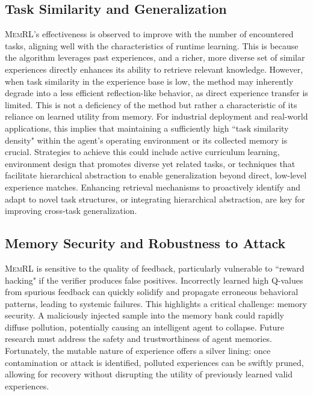 \documentclass{article}
\theoremstyle{plain}
\theoremstyle{definition}
\theoremstyle{remark}
\begin{document}
\subsection{Task Similarity and Generalization}
\textsc{MemRL}'s effectiveness is observed to improve with the number of encountered tasks, aligning well with the characteristics of runtime learning. This is because the algorithm leverages past experiences, and a richer, more diverse set of similar experiences directly enhances its ability to retrieve relevant knowledge. However, when task similarity in the experience base is low, the method may inherently degrade into a less efficient reflection-like behavior, as direct experience transfer is limited. This is not a deficiency of the method but rather a characteristic of its reliance on learned utility from memory. For industrial deployment and real-world applications, this implies that maintaining a sufficiently high ``task similarity density" within the agent's operating environment or its collected memory is crucial. Strategies to achieve this could include active curriculum learning, environment design that promotes diverse yet related tasks, or techniques that facilitate hierarchical abstraction to enable generalization beyond direct, low-level experience matches. Enhancing retrieval mechanisms to proactively identify and adapt to novel task structures, or integrating hierarchical abstraction, are key for improving cross-task generalization.

\subsection{Memory Security and Robustness to Attack}
\textsc{MemRL} is sensitive to the quality of feedback, particularly vulnerable to ``reward hacking" if the verifier produces false positives. Incorrectly learned high Q-values from spurious feedback can quickly solidify and propagate erroneous behavioral patterns, leading to systemic failures. This highlights a critical challenge: memory security. A maliciously injected sample into the memory bank could rapidly diffuse pollution, potentially causing an intelligent agent to collapse. Future research must address the safety and trustworthiness of agent memories. Fortunately, the mutable nature of experience offers a silver lining: once contamination or attack is identified, polluted experiences can be swiftly pruned, allowing for recovery without disrupting the utility of previously learned valid experiences.
\end{document}
